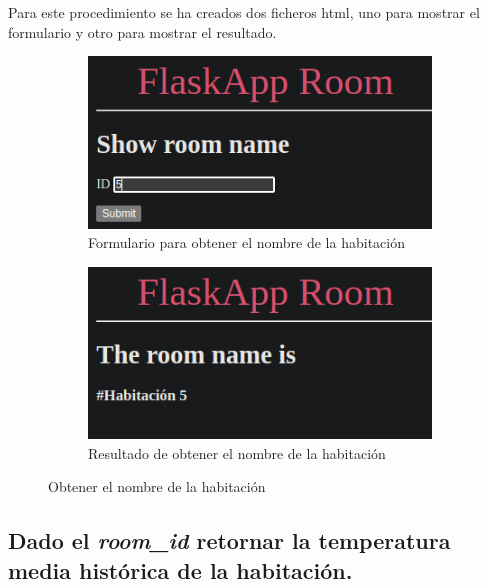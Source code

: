 \documentclass[11pt]{report}
\begin{document}
Para este procedimiento se ha creados dos ficheros html, uno para mostrar el formulario y otro para mostrar el resultado.
\begin{figure}[H]
  \begin{subfigure}{0.5\textwidth}
    \centering
    \includegraphics[scale=0.5]{img/room_name.png}
    \caption{Formulario para obtener el nombre de la habitación}
  \end{subfigure}%
  \begin{subfigure}{0.5\textwidth}
    \centering
    \includegraphics[scale=0.5]{img/result_room_name.png}
    \caption{Resultado de obtener el nombre de la habitación}
  \end{subfigure}
  \caption{Obtener el nombre de la habitación}
\end{figure}

\cleardoublepage

\subsection{Dado el \emph{room\_id} retornar la temperatura media histórica de la habitación.}
\end{document}
